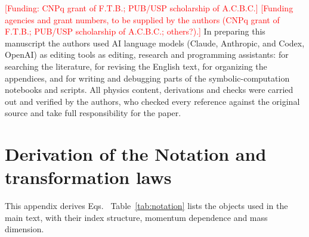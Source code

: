 \documentclass[prd,aps,preprint,superscriptaddress,nofootinbib,amsmath,amssymb,eqsecnum]{revtex4-2}
\newcommand{\todo}[1]{\textcolor{red}{[#1]}}
\providecommand{\DIFaddtex}[1]{{\protect\color{blue} \sf #1}} %
\providecommand{\DIFdeltex}[1]{{\protect\color{red} \scriptsize #1}} %
\providecommand{\DIFaddbegin}{} %
\providecommand{\DIFaddend}{} %
\providecommand{\DIFdelbegin}{} %
\providecommand{\DIFdelend}{} %
\providecommand{\DIFadd}[1]{\texorpdfstring{\DIFaddtex{#1}}{#1}} %
\providecommand{\DIFdel}[1]{\texorpdfstring{\DIFdeltex{#1}}{}} %
\begin{document}
\begin{acknowledgments}
\DIFdelbegin \DIFdel{\todo{Funding: CNPq grant of F.T.B.; PUB/USP scholarship of A.C.B.C.}
}\DIFdelend \DIFaddbegin \DIFadd{\todo{Funding agencies and grant numbers, to be supplied by the authors (CNPq grant of
F.T.B.; PUB/USP scholarship of A.C.B.C.; others?).}
}\DIFaddend In preparing this manuscript the authors used AI \DIFdelbegin \DIFdel{language models (Claude, Anthropic, and
Codex, OpenAI) as editing}\DIFdelend \DIFaddbegin \DIFadd{tools as editing, research }\DIFaddend and programming
assistants: for \DIFaddbegin \DIFadd{searching the literature, for }\DIFaddend revising the English text, for
organizing the appendices, and for writing and debugging parts of the symbolic-computation
notebooks and scripts. All physics content, derivations and checks were carried out and
verified by the authors, who \DIFaddbegin \DIFadd{checked every reference against the original source and }\DIFaddend take
full responsibility for the paper.
\end{acknowledgments}

\appendix

\section{\DIFdelbegin \DIFdel{Derivation of the }\DIFdelend \DIFaddbegin \DIFadd{Notation and }\DIFaddend transformation laws}
\label{app:transf}

\DIFdelbegin \DIFdel{This appendix derives Eqs.~}\DIFdelend \DIFaddbegin \DIFadd{Table~\ref{tab:notation} lists the objects used in the main text, with their index
structure, momentum dependence and mass dimension.
}
\end{document}
